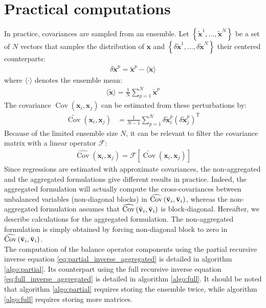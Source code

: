 \documentclass[12pt]{scrartcl}
\newcommand{\overbar}[1]{\mkern 1.5mu\overline{\mkern-1.5mu#1\mkern-1.5mu}\mkern 1.5mu}
\DeclareMathOperator{\Cov}{Cov}
\begin{document}
\section{Practical computations}
\label{sec:practical}
In practice, covariances are sampled from an ensemble. Let $\left\{\widetilde{\mathbf{x}}^1, \dots, \widetilde{\mathbf{x}}^N\right\}$ be a set of $N$ vectors that samples the distribution of $\mathbf{x}$ and $\left\{\delta \widetilde{\mathbf{x}}^1, \dots, \delta \widetilde{\mathbf{x}}^N\right\}$ their centered counterparts:
\begin{align}
\delta \widetilde{\mathbf{x}}^p = \widetilde{\mathbf{x}}^p - \langle \widetilde{\mathbf{x}} \rangle
\end{align}
where $\langle \cdot \rangle$ denotes the ensemble mean:
\begin{align}
\label{eq:exp_estim}
\langle \widetilde{\mathbf{x}} \rangle = \frac{1}{N} \sum_{p=1}^N \widetilde{\mathbf{x}}^p
\end{align}
The covariance $\Cov \left(\mathbf{x}_i, \mathbf{x}_j\right)$ can be estimated from these perturbations by:
\begin{align}
\label{eq:cov_estim}
\widetilde{\Cov}\left(\mathbf{x}_i, \mathbf{x}_j\right) & = \frac{1}{N-1} \sum_{p=1}^N \delta \widetilde{\mathbf{x}}^p_i \left(\delta \widetilde{\mathbf{x}}^p_j\right)^\mathrm{T}
\end{align}
Because of the limited ensemble size $N$, it can be relevant to filter the covariance matrix with a linear operator $\mathcal{F}$:
\begin{align}
\label{eq:cov_filter}
\widehat{\Cov}\left(\mathbf{x}_i, \mathbf{x}_j\right) = \mathcal{F} \left[\widetilde{\Cov}\left(\mathbf{x}_i, \mathbf{x}_j\right)\right]
\end{align}
$ $\\
Since regressions are estimated with approximate covariances, the non-aggregated and the aggregated formulations give different results in practice. Indeed, the aggregated formulation will actually compute the cross-covariances between unbalanced variables (non-diagonal blocks) in $\widehat{\Cov}\left(\overbar{\mathbf{v}}_i, \overbar{\mathbf{v}}_i\right)$, whereas the non-aggregated formulation assumes that $\widehat{\Cov}\left(\overbar{\mathbf{v}}_i, \overbar{\mathbf{v}}_i\right)$ is block-diagonal. Hereafter, we describe calculations for the aggregated formulation. The non-aggregated formulation is simply obtained by forcing non-diagonal block to zero in $\widehat{\Cov}\left(\overbar{\mathbf{v}}_i, \overbar{\mathbf{v}}_i\right)$.\\
$  $\\
The computation of the balance operator components using the partial recursive inverse equation \eqref{eq:partial_inverse_aggregated} is detailed in algorithm \ref{algo:partial}. Its counterpart using the full recursive inverse equation \eqref{eq:full_inverse_aggregated} is detailed in algorithm \ref{algo:full}. It should be noted that algorithm \ref{algo:partial} requires storing the ensemble twice, while algorithm \ref{algo:full} requires storing more matrices.
\end{document}
